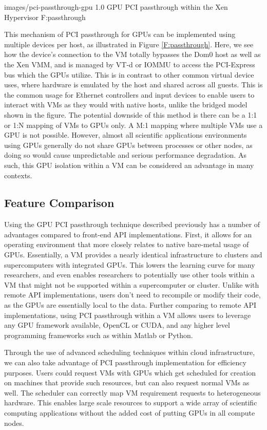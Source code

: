   {images/pci-passthrough-gpu}
  {1.0}
  {GPU PCI passthrough within the Xen Hypervisor}
  {F:passthrough}

This mechanism of PCI passthrough for GPUs can be implemented using multiple devices per host, as illustrated in Figure \ref{F:passthrough}. Here, we see how the device's connection to the VM totally bypasses the Dom0 host as well as the Xen VMM, and is managed by  VT-d or IOMMU to access the PCI-Express bus which the GPUs utilize. This is in contrast to other common virtual device uses, where hardware is emulated by the host and shared across all guests. This is the common usage for Ethernet controllers and input devices to enable users to interact with VMs as they would with native hosts, unlike the bridged model shown in the figure.  The potential downside of this method is there can be a 1:1 or 1:N mapping of VMs to GPUs only. A M:1 mapping where multiple VMs use a GPU is not possible.  However, almost all scientific applications environments using GPUs generally do not share GPUs between processes or other nodes, as doing so would cause unpredictable and serious performance degradation. As such, this GPU isolation within a VM can be considered an advantage in many contexts.

\subsection{Feature Comparison}

Using the GPU PCI passthrough technique described previously has a number of advantages compared to front-end API implementations. First, it allows for an operating environment that more closely relates to native bare-metal usage of GPUs. Essentially, a VM provides a nearly identical infrastructure to clusters and supercomputers with integrated GPUs. This lowers the learning curve for many researchers, and even enables researchers to potentially use other tools within a VM that might not be supported within a supercomputer or cluster.  Unlike with remote API implementations, users don't need to recompile or modify their code, as the GPUs are essentially local to the data. Further comparing to remote API implementations, using PCI passthrough within a VM allows users to leverage any GPU framework available, OpenCL or CUDA, and any higher level programming frameworks such as within Matlab or Python.

Through the use of advanced scheduling techniques within cloud infrastructure, we can also take advantage of PCI passthrough implementation for efficiency purposes. Users could request VMs with GPUs which get scheduled for creation on machines that provide such resources, but can also request normal VMs as well.  The scheduler can correctly map VM requirement requests to heterogeneous hardware. This enables large scale resources to support a wide array of scientific computing applications without the added cost of putting GPUs in all compute nodes.


